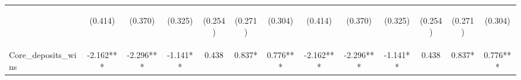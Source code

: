 \documentclass[]{article}
\begin{document}
\begin{center}
\begin{tabular}{lcccccccccccc}
\vspace{4pt} & \begin{footnotesize}(0.414)\end{footnotesize} & \begin{footnotesize}(0.370)\end{footnotesize} & \begin{footnotesize}(0.325)\end{footnotesize} & \begin{footnotesize}(0.254)\end{footnotesize} & \begin{footnotesize}(0.271)\end{footnotesize} & \begin{footnotesize}(0.304)\end{footnotesize} & \begin{footnotesize}(0.414)\end{footnotesize} & \begin{footnotesize}(0.370)\end{footnotesize} & \begin{footnotesize}(0.325)\end{footnotesize} & \begin{footnotesize}(0.254)\end{footnotesize} & \begin{footnotesize}(0.271)\end{footnotesize} & \begin{footnotesize}(0.304)\end{footnotesize} \\
Core\_deposits\_wins & -2.162*** & -2.296*** & -1.141** & 0.438 & 0.837* & 0.776*** & -2.162*** & -2.296*** & -1.141** & 0.438 & 0.837* & 0.776*** \\

\end{tabular}
\end{center}
\end{document}
